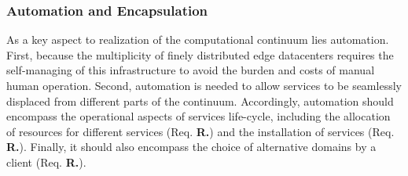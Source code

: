	
\subsubsection{Automation and Encapsulation}


As a key aspect to realization of the computational continuum lies automation. First, because the multiplicity of finely distributed edge datacenters requires the self-managing of this infrastructure to avoid the burden and costs of manual human operation. Second, automation is needed to allow services to be seamlessly displaced from different parts of the continuum. Accordingly, automation should encompass the operational aspects of services life-cycle, including the allocation of resources for different services (Req. \textbf{R.}) and the installation of services (Req. \textbf{R.}). Finally, it should also encompass the choice of alternative domains by a client (Req. \textbf{R.}).








	




